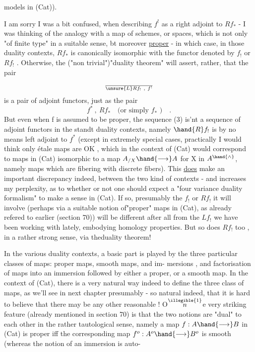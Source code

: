 
models in (Cat)).

I am sorry I was a bit confused, when describing $f^!$ as a right
adjoint to $Rf_*$ - I was thinking of the analogy with a map of schemes,
or spaces, which is not only "of finite type" in a suitable sense,
bt moreover \uline{proper} - in which case, in those duality contexts,
$Rf_*$ is canonically isomorphic with the functor denoted by $f_!$ or $Rf_!$ .
Otherwise, the ("non trivial")"duality theorem" will assert, rather,
that  the pair
\[ \over{\unsure{L}}{R}f_! \ , \ f^! \]
is a pair of adjoint functors, just as  the pair
\[ f^* \ , \ Rf_* \quad \text{(or simply } f_* \text{ )} \quad . \]
But even when f is assumed to be proper, the sequence (3) is'nt a
sequence of adjoint functors in the standt duality contexts, namely
$\hand{R}f_!$ is by no means left adjoint to $f^*$  (except in extremely special cases,
 practically I would think only étale maps are OK , which in
the context of (Cat) would correspond to  maps in
(Cat) isomorphic to a map $A_{/X} \hand{\longrightarrow} A$ for X in $A^{\hand{\wedge}}$, namely  maps
which are fibering with discrete fibers). This \uline{does} make an important
discrepancy indeed, between the two kind of contexts - and increases
my perplexity, as to whether or not one should expect a "four variance
duality formalism" to make a sense in (Cat). If so, presumably the
$f_!$ or $Rf_!$ it will involve (perhaps via a suitable notion of"proper"
maps in (Cat), as already refered to earlier (section 70)) will be
different after all from the $Lf_!$ we have been working with lately,
embodying homology properties. \xout{(}But so does $Rf_!$ too , in a rather
strong sense,\xout{(} via theduality theorem!\xout{)}

In the various duality contexts, a basic part is played by the
three particular classes of maps: proper maps, smooth maps, and im-%
mersions , and factorisation of maps into an immersion followed by
either a proper, or a smooth map. In the context of (Cat), there
is a very natural way indeed to define the three class of maps, as
we'll see in next chapter presumably - so natural indeed, that it is
hard to believe that there may be any other reasonable ! O$\overset{\illegible{1}}{n}$e very
striking feature (already mentioned in section 70) is that the two 
notions are "dual" to each other in the rather tautological sense,
namely  a map $f: A \hand{\longrightarrow} B$ in (Cat) is proper iff the corresponding map
$f^o : A^o \hand{\longrightarrow} B^o$ is smooth (whereas the notion of an immersion is auto-%


